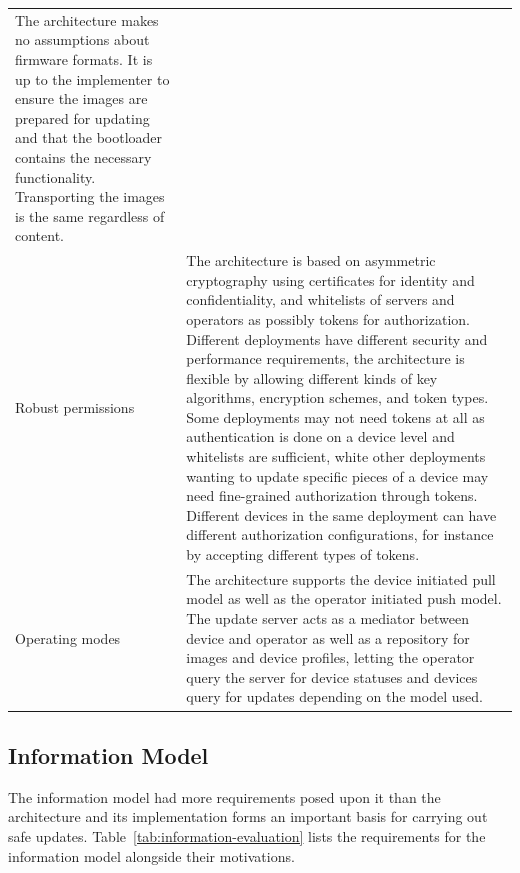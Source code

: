 \documentclass[0-thesis.tex]{subfiles}
\begin{document}
\begin{longtable}[]{@{}ll@{}}
\begin{minipage}[t]{0.53\columnwidth}
    The architecture makes no assumptions about firmware formats. It is up
    to the implementer to ensure the images are prepared for updating and
    that the bootloader contains the necessary functionality. Transporting
    the images is the same regardless of content.\strut
    \end{minipage}\tabularnewline
    \begin{minipage}[t]{0.41\columnwidth}\raggedright\strut
    Robust permissions\strut
    \end{minipage} & \begin{minipage}[t]{0.53\columnwidth}\raggedright\strut
    The architecture is based on asymmetric cryptography using certificates
    for identity and confidentiality, and whitelists of servers and
    operators as possibly tokens for authorization. Different deployments
    have different security and performance requirements, the architecture
    is flexible by allowing different kinds of key algorithms, encryption
    schemes, and token types. Some deployments may not need tokens at all as
    authentication is done on a device level and whitelists are sufficient,
    white other deployments wanting to update specific pieces of a device
    may need fine-grained authorization through tokens. Different devices in
    the same deployment can have different authorization configurations, for
    instance by accepting different types of tokens.\strut
    \end{minipage}\tabularnewline
    \begin{minipage}[t]{0.41\columnwidth}\raggedright\strut
    Operating modes\strut
    \end{minipage} & \begin{minipage}[t]{0.53\columnwidth}\raggedright\strut
    The architecture supports the device initiated pull model as well as the
    operator initiated push model. The update server acts as a mediator
    between device and operator as well as a repository for images and
    device profiles, letting the operator query the server for device
    statuses and devices query for updates depending on the model
    used.\strut
    \end{minipage}\tabularnewline
    \bottomrule
\end{longtable}
  
\subsection{Information Model}
\label{ssec:information-evaluation}
The information model had more requirements posed upon it than the architecture and its
implementation forms an important basis for carrying out safe updates.
Table~\ref{tab:information-evaluation} lists the requirements for the information model
alongside their motivations.
\end{document}
